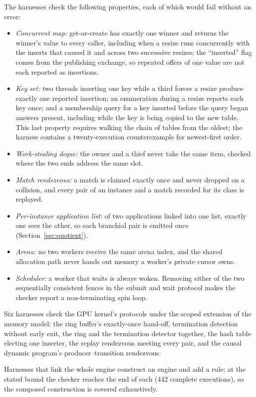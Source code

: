 The harnesses check the following properties, each of which would fail without an error:
\begin{itemize}
\item \emph{Concurrent map:} get-or-create has exactly one winner and returns the winner's value to
every caller, including when a resize runs concurrently with the inserts that caused it and across
two successive resizes; the ``inserted'' flag comes from the publishing exchange, so repeated
offers of one value are not each reported as insertions.
\item \emph{Key set:} two threads inserting one key while a third forces a resize produce exactly
one reported insertion; an enumeration during a resize reports each key once; and a membership
query for a key inserted before the query began answers present, including while the key is
being copied to the new table. This last property requires walking the chain of tables from the
oldest; the harness contains a twenty-execution counterexample for newest-first order.
\item \emph{Work-stealing deque:} the owner and a thief never take the same item, checked where the
two ends address the same slot.
\item \emph{Match rendezvous:} a match is claimed exactly once and never dropped on a collision,
and every pair of an instance and a match recorded for its class is replayed.
\item \emph{Per-instance application list:} of two applications linked into one list, exactly one
sees the other, so each branchial pair is emitted once (Section~\ref{sec:quotient}).
\item \emph{Arena:} no two workers receive the same arena index, and the shared allocation path
never hands out memory a worker's private cursor owns.
\item \emph{Scheduler:} a worker that waits is always woken. Removing either of the two
sequentially consistent fences in the submit and wait protocol makes the checker report a
non-terminating spin loop.
\end{itemize}

Six harnesses check the GPU kernel's protocols under the scoped extension of the memory model: the
ring buffer's exactly-once hand-off, termination detection without early exit, the ring and the
termination detector together, the hash table electing one inserter, the replay rendezvous meeting
every pair, and the causal dynamic program's producer--transition rendezvous.

Harnesses that link the whole engine construct an engine and add a rule; at the stated bound the
checker reaches the end of each (442 complete executions), so the composed construction is covered
exhaustively.

